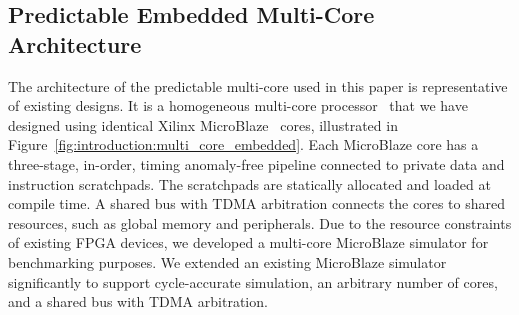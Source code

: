 \subsection{Predictable Embedded Multi-Core Architecture}
\label{sec:introduction:pret:multicore}
The architecture of the predictable multi-core used in this 
paper is representative of existing designs.
It is a homogeneous multi-core 
processor~\cite{multithreading_designing_predictable_considerations,pret_java_architecture}
that we have designed using identical Xilinx MicroBlaze~\cite{microblaze} cores, 
illustrated in Figure~\ref{fig:introduction:multi_core_embedded}. 
Each MicroBlaze core has a three-stage, in-order, timing anomaly-free pipeline 
connected to private data and instruction scratchpads.
The scratchpads are statically allocated and loaded at compile time. A shared 
bus with TDMA arbitration connects 
the cores to shared resources, such as global memory and peripherals. Due to 
the resource constraints of existing FPGA devices, we developed a multi-core MicroBlaze
simulator for benchmarking 
purposes. We extended an existing MicroBlaze simulator~\cite{mb_simulator} 
significantly to support cycle-accurate simulation, an arbitrary number of cores, 
and a shared bus with TDMA arbitration.
